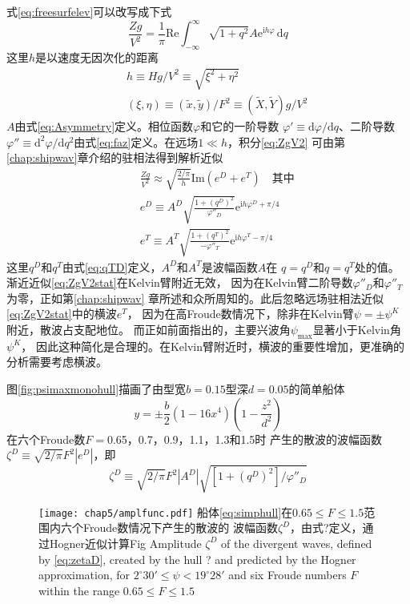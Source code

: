 式\eqref{eq:freesurfelev}可以改写成下式
\begin{equation}
  \frac{Zg}{V^2}=\frac{1}{\pi}\mathrm{Re}\int_{-\infty}^{\infty}
  \sqrt{1+q^2}A\mathrm{e}^{\mathrm{i}h\varphi}\,\mathrm{d}q
  \label{eq:ZgV2}
\end{equation}
这里$h$是以速度无因次化的距离
\begin{eqnarray}
  && h\equiv Hg/V^2\equiv \sqrt{\xi^2+\eta^2}\label{eq:h}\\
  && (\xi,\eta)\equiv (\tilde{x},\tilde{y})/F^2\equiv(\tilde{X},\tilde{Y})g/V^2
  \label{eq:xieta}
\end{eqnarray}
$A$由式\eqref{eq:Asymmetry}定义。相位函数$\varphi$和它的一阶导数
$\varphi'\equiv\mathrm{d}\varphi/\mathrm{d}q$、二阶导数$\varphi''\equiv\mathrm{d}^2\varphi/\mathrm{d}q^2$由式\eqref{eq:faz}定义。在远场$1\ll h$，积分\eqref{eq:ZgV2}
可由第\ref{chap:shipwav}章介绍的驻相法得到解析近似
\begin{eqnarray}
  &&\frac{Zg}{V^2}\approx\sqrt{\frac{2/\pi}{h}}\mathrm{Im}(e^D+e^T)\quad\text{其中}
  \label{eq:ZgV2stat}\\
  &&e^D\equiv A^D\sqrt{\frac{1+(q^D)^2}{\varphi''_D}}\mathrm{e}^{\mathrm{i}h\varphi^D+\pi/4}\label{eq:eD}\\
  &&e^T\equiv A^T\sqrt{\frac{1+(q^T)^2}{-\varphi''_T}}\mathrm{e}^{\mathrm{i}h\varphi^T-\pi/4}\label{eq:eT}
\end{eqnarray}
这里$q^D$和$q^T$由式\eqref{eq:qTD}定义，$A^D$和$A^T$是波幅函数$A$在
$q=q^D$和$q=q^T$处的值。渐近近似\eqref{eq:ZgV2stat}在Kelvin臂附近无效，
因为在Kelvin臂二阶导数$\varphi''_D$和$\varphi''_T$为零，正如第\ref{chap:shipwav}
章所述和众所周知的。此后忽略远场驻相法近似\eqref{eq:ZgV2stat}中的横波$e^T$，
因为在高Froude数情况下，除非在Kelvin臂$\psi=\pm\psi^K$附近，散波占支配地位。
而正如前面指出的，主要兴波角$\psi_{\max}$显著小于Kelvin角$\psi^K$，
因此这种简化是合理的。在Kelvin臂附近时，横波的重要性增加，更准确的分析需要考虑横波。

图\ref{fig:psimaxmonohull}描画了由型宽$b=0.15$型深$d=0.05$的简单船体
\begin{equation}
  y=\pm\frac{b}{2}(1-16x^4)\left(1-\frac{z^2}{d^2}\right)
  \label{eq:simphull}
\end{equation}
在六个Froude数$F=$0.65，0.7，0.9，1.1，1.3和1.5时
产生的散波的波幅函数$\zeta^D\equiv\sqrt{2/\pi}F^2|e^D|$，即
\begin{equation}
  \zeta^D\equiv\sqrt{2/\pi}F^2|A^D|\sqrt{[1+(q^D)^2]/\varphi''_D}
  \label{eq:zetaD}
\end{equation}
%
\begin{figure}[htp]
  \centering
  \captionstyle{\centering}
  \texttt{[image: chap5/amplfunc.pdf]}
  {船体\eqref{eq:simphull}在$0.65\le F\le 1.5$范围内六个Froude数情况下产生的散波的
  波幅函数$\zeta^D$，由式?定义，通过Hogner近似计算}{Fig}
  {Amplitude $\zeta^D$ of the divergent waves, defined by \eqref{eq:zetaD}, 
  created by the hull ? and predicted by the Hogner approximation, 
  for $2^\circ30'\le\psi<19^\circ28'$ and six Froude numbers $F$ within the range 
$0.65 \le F \le 1.5$}
\end{figure}

